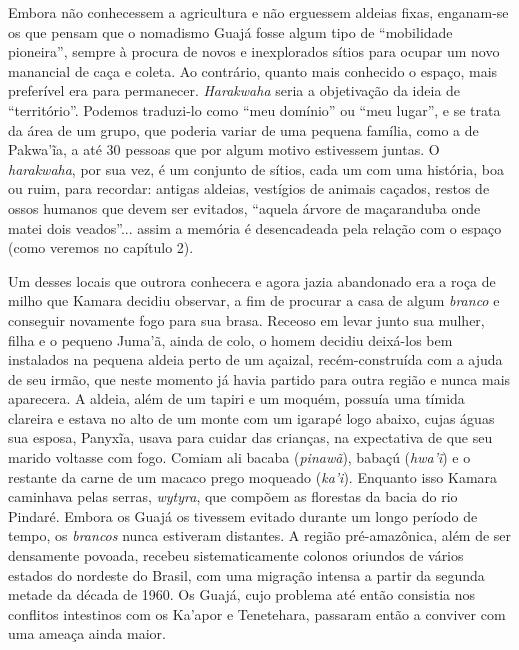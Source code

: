 Embora não conhecessem a agricultura e não erguessem aldeias fixas,
enganam-se os que pensam que o nomadismo Guajá fosse algum tipo de
``mobilidade pioneira'', sempre à procura de novos e inexplorados sítios
para ocupar um novo manancial de caça e coleta. Ao contrário, quanto
mais conhecido o espaço, mais preferível era para permanecer.
\emph{Harakwaha} seria a objetivação da ideia de ``território''. Podemos
traduzi-lo como ``meu domínio'' ou ``meu lugar'', e se trata da área de
um grupo, que poderia variar de uma pequena família, como a de Pakwa'ĩa,
a até 30 pessoas que por algum motivo estivessem juntas. O
\emph{harakwaha}, por sua vez, é um conjunto de sítios, cada um com uma
história, boa ou ruim, para recordar: antigas aldeias, vestígios de
animais caçados, restos de ossos humanos que devem ser evitados,
``aquela árvore de maçaranduba onde matei dois veados''... assim a
memória é desencadeada pela relação com o espaço (como veremos no
capítulo 2).

Um desses locais que outrora conhecera e agora jazia abandonado era a roça
de milho que Kamara decidiu observar, a fim de procurar a casa de algum
\emph{branco} e conseguir novamente fogo para sua brasa. Receoso em
levar junto sua mulher, filha e o pequeno Juma'ã, ainda de colo, o homem
decidiu deixá-los bem instalados na pequena aldeia perto de um açaizal,
recém-construída com a ajuda de seu irmão, que neste momento já havia
partido para outra região e nunca mais aparecera. A aldeia, além de um
tapiri e um moquém, possuía uma tímida clareira e estava no alto de um
monte com um igarapé logo abaixo, cujas águas sua esposa, Panyxĩa, usava
para cuidar das crianças, na expectativa de que seu marido voltasse com
fogo. Comiam ali bacaba (\emph{pinawã}), babaçú (\emph{hwa'ĩ}) e o
restante da carne de um macaco prego moqueado (\emph{ka'i}). Enquanto
isso Kamara caminhava pelas serras, \emph{wytyra}, que compõem as
florestas da bacia do rio Pindaré. Embora os Guajá os tivessem evitado
durante um longo período de tempo, os \emph{brancos} nunca estiveram
distantes. A região pré-amazônica, além de ser densamente povoada,
recebeu sistematicamente colonos oriundos de vários estados do nordeste
do Brasil, com uma migração intensa a partir da segunda metade da década
de 1960. Os Guajá, cujo problema até então consistia nos conflitos
intestinos com os Ka'apor e Tenetehara, passaram então a conviver com
uma ameaça ainda maior.

